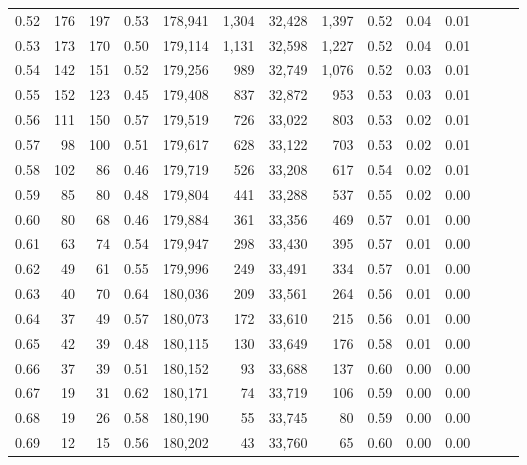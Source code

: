 \begin{tabular}{rrrrrrrrrrrrrr}
0.52 &     176 &    197 &  0.53 &  178,941 &    1,304 &  32,428 &   1,397 &  0.52 &  0.04 &      0.01 \\
0.53 &     173 &    170 &  0.50 &  179,114 &    1,131 &  32,598 &   1,227 &  0.52 &  0.04 &      0.01 \\
0.54 &     142 &    151 &  0.52 &  179,256 &      989 &  32,749 &   1,076 &  0.52 &  0.03 &      0.01 \\
0.55 &     152 &    123 &  0.45 &  179,408 &      837 &  32,872 &     953 &  0.53 &  0.03 &      0.01 \\
0.56 &     111 &    150 &  0.57 &  179,519 &      726 &  33,022 &     803 &  0.53 &  0.02 &      0.01 \\
0.57 &      98 &    100 &  0.51 &  179,617 &      628 &  33,122 &     703 &  0.53 &  0.02 &      0.01 \\
0.58 &     102 &     86 &  0.46 &  179,719 &      526 &  33,208 &     617 &  0.54 &  0.02 &      0.01 \\
0.59 &      85 &     80 &  0.48 &  179,804 &      441 &  33,288 &     537 &  0.55 &  0.02 &      0.00 \\
0.60 &      80 &     68 &  0.46 &  179,884 &      361 &  33,356 &     469 &  0.57 &  0.01 &      0.00 \\
0.61 &      63 &     74 &  0.54 &  179,947 &      298 &  33,430 &     395 &  0.57 &  0.01 &      0.00 \\
0.62 &      49 &     61 &  0.55 &  179,996 &      249 &  33,491 &     334 &  0.57 &  0.01 &      0.00 \\
0.63 &      40 &     70 &  0.64 &  180,036 &      209 &  33,561 &     264 &  0.56 &  0.01 &      0.00 \\
0.64 &      37 &     49 &  0.57 &  180,073 &      172 &  33,610 &     215 &  0.56 &  0.01 &      0.00 \\
0.65 &      42 &     39 &  0.48 &  180,115 &      130 &  33,649 &     176 &  0.58 &  0.01 &      0.00 \\
0.66 &      37 &     39 &  0.51 &  180,152 &       93 &  33,688 &     137 &  0.60 &  0.00 &      0.00 \\
0.67 &      19 &     31 &  0.62 &  180,171 &       74 &  33,719 &     106 &  0.59 &  0.00 &      0.00 \\
0.68 &      19 &     26 &  0.58 &  180,190 &       55 &  33,745 &      80 &  0.59 &  0.00 &      0.00 \\
0.69 &      12 &     15 &  0.56 &  180,202 &       43 &  33,760 &      65 &  0.60 &  0.00 &      0.00 \\

\end{tabular}
